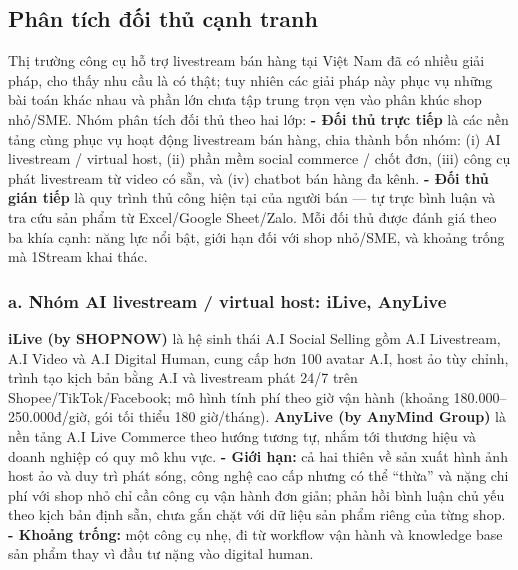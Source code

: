 \subsection{Phân tích đối thủ cạnh tranh}

Thị trường công cụ hỗ trợ livestream bán hàng tại Việt Nam đã có nhiều giải pháp,
cho thấy nhu cầu là có thật; tuy nhiên các giải pháp này phục vụ những bài toán
khác nhau và phần lớn chưa tập trung trọn vẹn vào phân khúc shop nhỏ/SME. Nhóm
phân tích đối thủ theo hai lớp:
\newline 
 \textbf{- Đối thủ trực tiếp} là các nền tảng cùng
phục vụ hoạt động livestream bán hàng, chia thành bốn nhóm: (i) AI livestream /
virtual host, (ii) phần mềm social commerce / chốt đơn, (iii) công cụ phát
livestream từ video có sẵn, và (iv) chatbot bán hàng đa kênh. 
\newline
\textbf{- Đối thủ
gián tiếp} là quy trình thủ công hiện tại của người bán --- tự trực bình luận và
tra cứu sản phẩm từ Excel/Google Sheet/Zalo. Mỗi đối thủ được đánh giá theo ba
khía cạnh: năng lực nổi bật, giới hạn đối với shop nhỏ/SME, và khoảng trống mà
1Stream khai thác.

\subsubsection*{a. Nhóm AI livestream / virtual host: iLive, AnyLive}
\textbf{iLive (by SHOPNOW)} là hệ sinh thái A.I Social Selling gồm A.I Livestream,
A.I Video và A.I Digital Human, cung cấp hơn 100 avatar A.I, host ảo tùy chỉnh,
trình tạo kịch bản bằng A.I và livestream phát 24/7 trên Shopee/TikTok/Facebook;
mô hình tính phí theo giờ vận hành (khoảng 180.000--250.000đ/giờ, gói tối thiểu
180 giờ/tháng). \textbf{AnyLive (by AnyMind Group)} là nền tảng A.I Live Commerce
theo hướng tương tự, nhắm tới thương hiệu và doanh nghiệp có quy mô khu vực.
\newline
\textbf{- Giới hạn:} cả hai thiên về sản xuất hình ảnh host ảo và duy trì phát
sóng, công nghệ cao cấp nhưng có thể ``thừa'' và nặng chi phí với shop nhỏ chỉ
cần công cụ vận hành đơn giản; phản hồi bình luận chủ yếu theo kịch bản định sẵn,
chưa gắn chặt với dữ liệu sản phẩm riêng của từng shop.
\newline
 \textbf{- Khoảng trống:}
một công cụ nhẹ, đi từ workflow vận hành và knowledge base sản phẩm thay vì đầu
tư nặng vào digital human.

